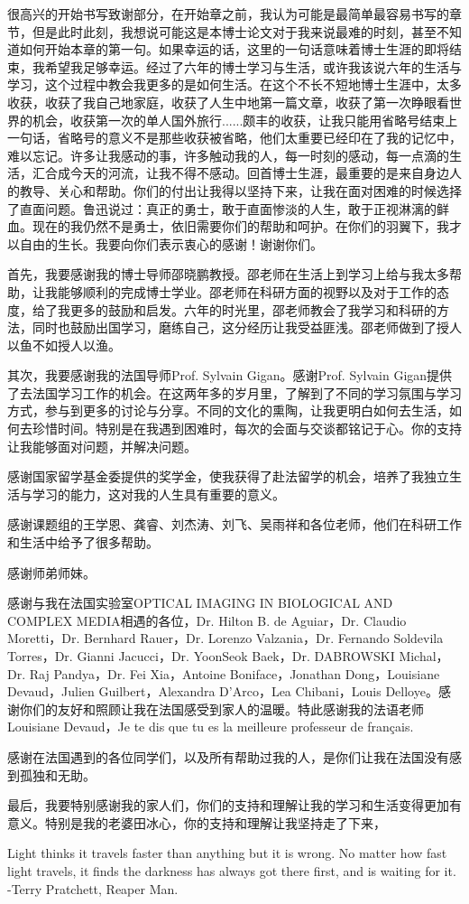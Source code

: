 
\begin{thanks}

很高兴的开始书写致谢部分，在开始章之前，我认为可能是最简单最容易书写的章节，但是此时此刻，我想说可能这是本博士论文对于我来说最难的时刻，甚至不知道如何开始本章的第一句。如果幸运的话，这里的一句话意味着博士生涯的即将结束，我希望我足够幸运。经过了六年的博士学习与生活，或许我该说六年的生活与学习，这个过程中教会我更多的是如何生活。在这个不长不短地博士生涯中，太多收获，收获了我自己地家庭，收获了人生中地第一篇文章，收获了第一次睁眼看世界的机会，收获第一次的单人国外旅行......颇丰的收获，让我只能用省略号结束上一句话，省略号的意义不是那些收获被省略，他们太重要已经印在了我的记忆中，难以忘记。许多让我感动的事，许多触动我的人，每一时刻的感动，每一点滴的生活，汇合成今天的河流，让我不得不感动。回首博士生涯，最重要的是来自身边人的教导、关心和帮助。你们的付出让我得以坚持下来，让我在面对困难的时候选择了直面问题。鲁迅说过：真正的勇士，敢于直面惨淡的人生，敢于正视淋漓的鲜血。现在的我仍然不是勇士，依旧需要你们的帮助和呵护。在你们的羽翼下，我才以自由的生长。我要向你们表示衷心的感谢！谢谢你们。

首先，我要感谢我的博士导师邵晓鹏教授。邵老师在生活上到学习上给与我太多帮助，让我能够顺利的完成博士学业。邵老师在科研方面的视野以及对于工作的态度，给了我更多的鼓励和启发。六年的时光里，邵老师教会了我学习和科研的方法，同时也鼓励出国学习，磨练自己，这分经历让我受益匪浅。邵老师做到了授人以鱼不如授人以渔。

其次，我要感谢我的法国导师Prof. Sylvain Gigan。感谢Prof. Sylvain Gigan提供了去法国学习工作的机会。在这两年多的岁月里，了解到了不同的学习氛围与学习方式，参与到更多的讨论与分享。不同的文化的熏陶，让我更明白如何去生活，如何去珍惜时间。特别是在我遇到困难时，每次的会面与交谈都铭记于心。你的支持让我能够面对问题，并解决问题。

感谢国家留学基金委提供的奖学金，使我获得了赴法留学的机会，培养了我独立生活与学习的能力，这对我的人生具有重要的意义。

感谢课题组的王学恩、龚睿、刘杰涛、刘飞、吴雨祥和各位老师，他们在科研工作和生活中给予了很多帮助。

感谢师弟师妹。

感谢与我在法国实验室OPTICAL IMAGING IN BIOLOGICAL AND COMPLEX MEDIA相遇的各位，Dr. Hilton B. de Aguiar，Dr. Claudio Moretti，Dr. Bernhard Rauer，Dr. Lorenzo Valzania，Dr. Fernando Soldevila Torres，Dr. Gianni Jacucci，Dr. YoonSeok Baek，Dr. DABROWSKI Michal，Dr. Raj Pandya，Dr. Fei Xia，Antoine Boniface，Jonathan Dong，Louisiane Devaud，Julien Guilbert，Alexandra D’Arco，Lea Chibani，Louis Delloye。感谢你们的友好和照顾让我在法国感受到家人的温暖。特此感谢我的法语老师Louisiane Devaud，Je te dis que tu es la meilleure professeur de français.

感谢在法国遇到的各位同学们，以及所有帮助过我的人，是你们让我在法国没有感到孤独和无助。

最后，我要特别感谢我的家人们，你们的支持和理解让我的学习和生活变得更加有意义。特别是我的老婆田冰心，你的支持和理解让我坚持走了下来，

Light thinks it travels faster than anything but it is wrong. No matter how fast light travels, it finds the darkness has always got there first, and is waiting for it. -Terry Pratchett, Reaper Man.
\end{thanks}

